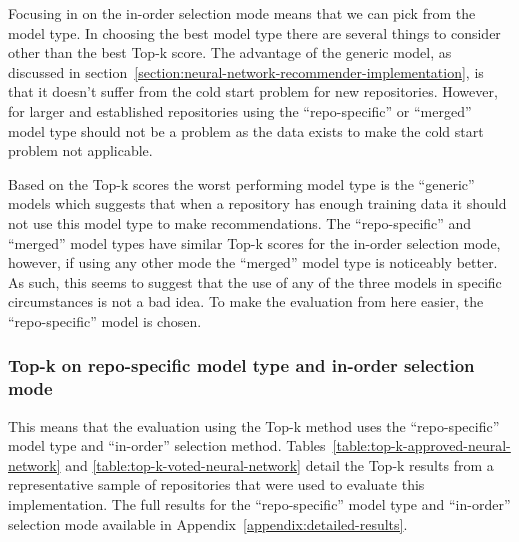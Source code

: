 Focusing in on the in-order selection mode means that we can pick from the model type. In choosing the best model type there are several things to consider other than the best Top-k score. The advantage of the generic model, as discussed in section~\ref{section:neural-network-recommender-implementation}, is that it doesn't suffer from the cold start problem for new repositories. However, for larger and established repositories using the ``repo-specific'' or ``merged'' model type should not be a problem as the data exists to make the cold start problem not applicable.

Based on the Top-k scores the worst performing model type is the ``generic'' models which suggests that when a repository has enough training data it should not use this model type to make recommendations. The ``repo-specific'' and ``merged'' model types have similar Top-k scores for the in-order selection mode, however, if using any other mode the ``merged'' model type is noticeably better. As such, this seems to suggest that the use of any of the three models in specific circumstances is not a bad idea. To make the evaluation from here easier, the ``repo-specific'' model is chosen.


\subsubsection{Top-k on repo-specific model type and in-order selection mode}

This means that the evaluation using the Top-k method uses the ``repo-specific'' model type and ``in-order'' selection method. Tables~\ref{table:top-k-approved-neural-network} and \ref{table:top-k-voted-neural-network} detail the Top-k results from a representative sample of repositories that were used to evaluate this implementation. The full results for the ``repo-specific'' model type and ``in-order'' selection mode available in Appendix~\ref{appendix:detailed-results}.

